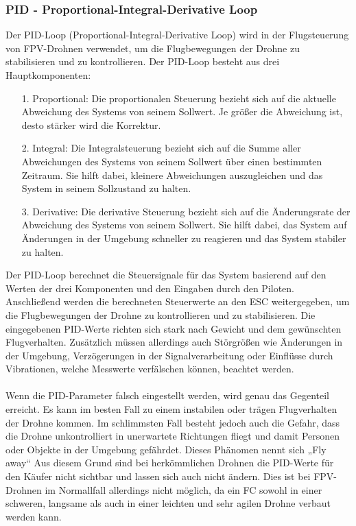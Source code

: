\subsubsection[PID - Proportional-Integral-Derivative Loop]{PID - Proportional-Integral-Derivative Loop}
    Der PID-Loop (Proportional-Integral-Derivative Loop) wird in der Flugsteuerung von FPV-Drohnen verwendet, um die Flugbewegungen der Drohne zu stabilisieren und zu kontrollieren. Der PID-Loop besteht aus drei Hauptkomponenten:

    \begin{itemize}
        \item[1.] Proportional: Die proportionalen Steuerung bezieht sich auf die aktuelle Abweichung des Systems von seinem Sollwert. Je größer die Abweichung ist, desto stärker wird die Korrektur.
        \item[2.]Integral: Die Integralsteuerung bezieht sich auf die Summe aller Abweichungen des Systems von seinem Sollwert über einen bestimmten Zeitraum. Sie hilft dabei, kleinere Abweichungen auszugleichen und das System in seinem Sollzustand zu halten.
        \item[3.] Derivative: Die derivative Steuerung bezieht sich auf die Änderungsrate der Abweichung des Systems von seinem Sollwert. Sie hilft dabei, das System auf Änderungen in der Umgebung schneller zu reagieren und das System stabiler zu halten.
     \end{itemize}

     Der PID-Loop berechnet die Steuersignale für das System basierend auf den Werten der drei Komponenten und den Eingaben durch den Piloten. Anschließend werden die berechneten Steuerwerte an den ESC weitergegeben, um die Flugbewegungen der Drohne zu kontrollieren und zu stabilisieren. Die eingegebenen PID-Werte richten sich stark nach Gewicht und dem gewünschten Flugverhalten. Zusätzlich müssen allerdings auch Störgrößen wie Änderungen in der Umgebung, Verzögerungen in der Signalverarbeitung oder Einflüsse durch Vibrationen, welche Messwerte verfälschen können, beachtet werden.
     \\ \\
     Wenn die PID-Parameter falsch eingestellt werden, wird genau das Gegenteil erreicht. Es kann im besten Fall zu einem instabilen oder trägen Flugverhalten der Drohne kommen. Im schlimmsten Fall besteht jedoch auch die Gefahr, dass die Drohne unkontrolliert in unerwartete Richtungen fliegt und damit Personen oder Objekte in der Umgebung gefährdet. Dieses Phänomen nennt sich „Fly away“ Aus diesem Grund sind bei herkömmlichen Drohnen die PID-Werte für den Käufer nicht sichtbar und lassen sich auch nicht ändern. Dies ist bei FPV-Drohnen im Normallfall allerdings nicht möglich, da ein FC sowohl in einer schweren, langsame als auch in einer leichten und sehr agilen Drohne verbaut werden kann.